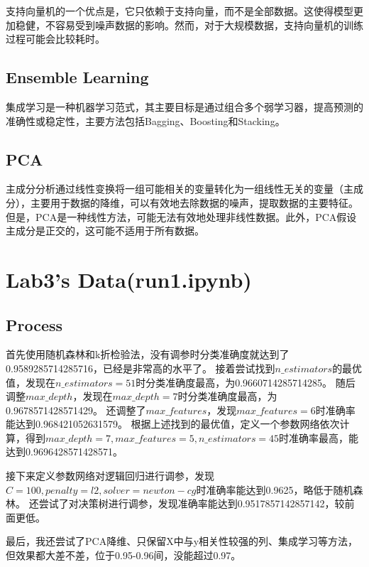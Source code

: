 \documentclass{ctexart}
\begin{document}
支持向量机的一个优点是，它只依赖于支持向量，而不是全部数据。这使得模型更加稳健，不容易受到噪声数据的影响。然而，对于大规模数据，支持向量机的训练过程可能会比较耗时。
	\subsection{Ensemble Learning}
	集成学习是一种机器学习范式，其主要目标是通过组合多个弱学习器，提高预测的准确性或稳定性，主要方法包括Bagging、Boosting和Stacking。
	\subsection{PCA}
	主成分分析通过线性变换将一组可能相关的变量转化为一组线性无关的变量（主成分），主要用于数据的降维，可以有效地去除数据的噪声，提取数据的主要特征。但是，PCA是一种线性方法，可能无法有效地处理非线性数据。此外，PCA假设主成分是正交的，这可能不适用于所有数据。
    \section{Lab3's Data(run1.ipynb)}
	\subsection{Process}
    首先使用随机森林和k折检验法，没有调参时分类准确度就达到了0.9589285714285716，已经是非常高的水平了。
	接着尝试找到$n\_estimators$的最优值，发现在$n\_estimators=51$时分类准确度最高，为0.9660714285714285。
	随后调整$max\_depth$，发现在$max\_depth=7$时分类准确度最高，为0.9678571428571429。
	还调整了$max\_features$，发现$max\_features=6$时准确率能达到0.968421052631579。
	根据上述找到的最优值，定义一个参数网络依次计算，得到$max\_depth=7, max\_features=5, n\_estimators=45$时准确率最高，能达到0.9696428571428571。
	
	接下来定义参数网络对逻辑回归进行调参，发现$C=100, penalty=l2, solver=newton-cg$时准确率能达到0.9625，略低于随机森林。
	还尝试了对决策树进行调参，发现准确率能达到0.9517857142857142，较前面更低。

	最后，我还尝试了PCA降维、只保留X中与y相关性较强的列、集成学习等方法，但效果都大差不差，位于0.95-0.96间，没能超过0.97。
\end{document}
